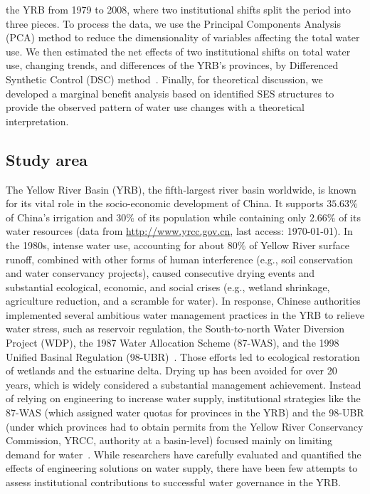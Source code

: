 
the YRB from 1979 to 2008, where two institutional shifts split the period into three pieces.
To process the data, we use the Principal Components Analysis (PCA) method to reduce the dimensionality of variables affecting the total water use.
We then estimated the net effects of two institutional shifts on total water use, changing trends, and differences of the YRB's provinces, by Differenced Synthetic Control (DSC) method~\cite{arkhangelsky2021}.
Finally, for theoretical discussion, we developed a marginal benefit analysis based on identified SES structures to provide the observed pattern of water use changes with a theoretical interpretation.

\subsection{Study area}\label{sec:yrb}

The Yellow River Basin (YRB), the fifth-largest river basin worldwide, is known for its vital role in the socio-economic development of China.
It supports $35.63\%$ of China's irrigation and $30\%$ of its population while containing only $2.66\%$ of its water resources (data from \href{http://www.yrcc.gov.cn}{http://www.yrcc.gov.cn}, last access: \today).
In the 1980s, intense water use, accounting for about $80\%$ of Yellow River surface runoff, combined with other forms of human interference (e.g., soil conservation and water conservancy projects), caused consecutive drying events and substantial ecological, economic, and social crises (e.g., wetland shrinkage, agriculture reduction, and a scramble for water).
In response, Chinese authorities implemented several ambitious water management practices in the YRB to relieve water stress, such as reservoir regulation, the South-to-north Water Diversion Project (WDP), the 1987 Water Allocation Scheme (87-WAS), and the 1998 Unified Basinal Regulation (98-UBR)~\cite{long2020, wang2019d}.
Those efforts led to ecological restoration of wetlands and the estuarine delta. Drying up has been avoided for over 20 years, which is widely considered a substantial management achievement.
Instead of relying on engineering to increase water supply, institutional strategies like the 87-WAS (which assigned water quotas for provinces in the YRB) and the 98-UBR (under which provinces had to obtain permits from the Yellow River Conservancy Commission, YRCC, authority at a basin-level) focused mainly on limiting demand for water~\cite{bouckaert2022, speed2013}.
While researchers have carefully evaluated and quantified the effects of engineering solutions on water supply\cite{long2020}, there have been few attempts to assess institutional contributions to successful water governance in the YRB.

